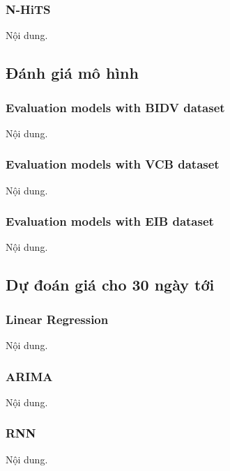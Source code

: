 \subsubsection{N-HiTS}
Nội dung.






\subsection{Đánh giá mô hình} 
\subsubsection{Evaluation models with BIDV dataset}
Nội dung.

\subsubsection{Evaluation models with VCB dataset}
Nội dung.

\subsubsection{Evaluation models with EIB dataset}
Nội dung.






\subsection{Dự đoán giá cho 30 ngày tới} 
\subsubsection{Linear Regression}
Nội dung.



\subsubsection{ARIMA}
Nội dung.




\subsubsection{RNN}
Nội dung.




